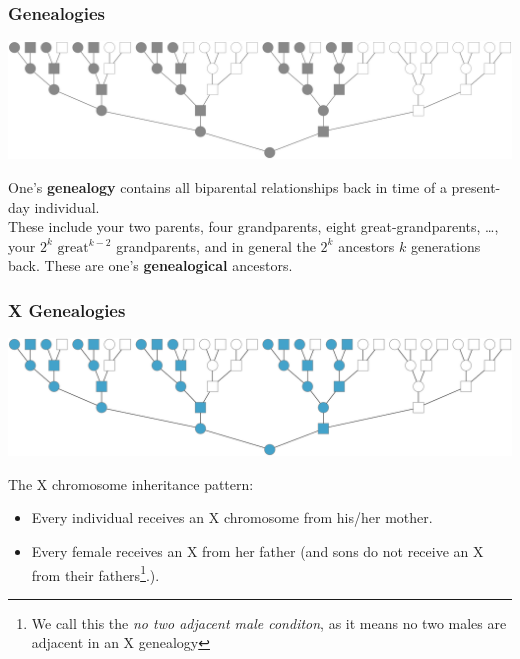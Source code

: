 \documentclass[hyperref={colorlinks = true,
                         urlcolor = blue,
                         linkcolor = blue}]{beamer}
\begin{document}
\begin{frame}
  \frametitle{Genealogies}

  \includegraphics[width=\textwidth]{fig/genealogy}

  One's \textbf{genealogy} contains all biparental relationships back in time
  of a present-day individual.\\[1em]

  These include your two parents, four grandparents, eight great-grandparents,
  \ldots, your $2^k$ $\text{great}^{k-2}$ grandparents, and in general the
  $2^k$ ancestors $k$ generations back. These are one's \textbf{genealogical}
  ancestors.\\[2em]

\end{frame}

\begin{frame}
  \frametitle{X Genealogies}
  \includegraphics[width=\textwidth]{fig/x-genealogy}

  The X chromosome inheritance pattern:\\[1em]
  \begin{itemize}
    \item Every individual receives an X chromosome from his/her mother.
    \item Every female receives an X from her father (and sons do not receive an X from their fathers\footnote{We call this the \emph{no two adjacent male conditon}, as it means no two males are adjacent in an X genealogy}.).
  \end{itemize}
\end{frame}
\end{document}
